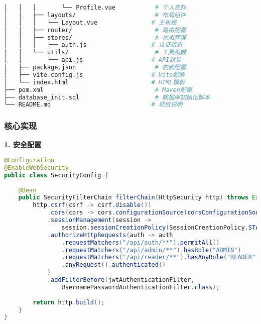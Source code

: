 \documentclass[12pt,a4paper]{article}
\begin{document}
\begin{lstlisting}[language=bash]
│   │   │       └── Profile.vue           # 个人资料
│   │   ├── layouts/                      # 布局组件
│   │   │   └── Layout.vue               # 主布局
│   │   ├── router/                       # 路由配置
│   │   ├── stores/                       # 状态管理
│   │   │   └── auth.js                  # 认证状态
│   │   └── utils/                        # 工具函数
│   │       └── api.js                   # API封装
│   ├── package.json                      # 依赖配置
│   ├── vite.config.js                   # Vite配置
│   └── index.html                       # HTML模板
├── pom.xml                               # Maven配置
├── database_init.sql                     # 数据库初始化脚本
└── README.md                            # 项目说明
\end{lstlisting}

\subsubsection{核心实现}

\textbf{1. 安全配置}
\begin{lstlisting}[language=java]
@Configuration
@EnableWebSecurity
public class SecurityConfig {
    
    @Bean
    public SecurityFilterChain filterChain(HttpSecurity http) throws Exception {
        http.csrf(csrf -> csrf.disable())
            .cors(cors -> cors.configurationSource(corsConfigurationSource()))
            .sessionManagement(session -> 
                session.sessionCreationPolicy(SessionCreationPolicy.STATELESS))
            .authorizeHttpRequests(auth -> auth
                .requestMatchers("/api/auth/**").permitAll()
                .requestMatchers("/api/admin/**").hasRole("ADMIN")
                .requestMatchers("/api/reader/**").hasAnyRole("READER", "ADMIN")
                .anyRequest().authenticated()
            )
            .addFilterBefore(jwtAuthenticationFilter, 
                UsernamePasswordAuthenticationFilter.class);
        
        return http.build();
    }
}
\end{lstlisting}
\end{document}
